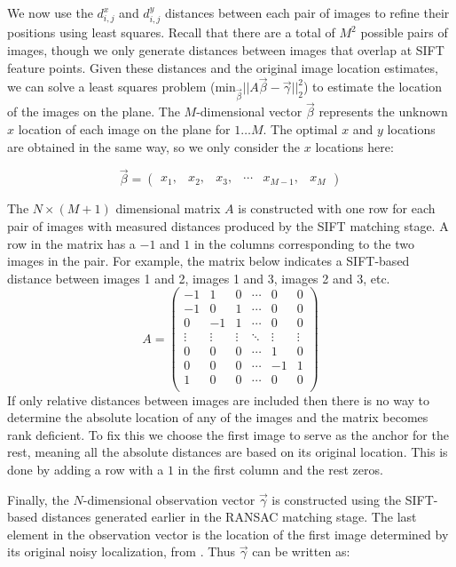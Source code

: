 \message{ !name(oldpaper.tex)}\documentclass[10pt,twocolumn,letterpaper]{article}
\begin{document}
We now use the $d^x_{i,j}$ and $d^y_{i,j}$ distances between each pair
of images to refine their positions using least squares. Recall that
there are a total of $M^{2}$ possible pairs of images, though we only
generate distances between images that overlap at SIFT feature
points. Given these distances and the original image location
estimates, we can solve a least squares problem
($\textrm{min}_{\vec{\beta}} ||A \vec{\beta} - \vec{\gamma}||_2^2 $)
to estimate the location of the images on the plane. The
$M$-dimensional vector $\vec{\beta}$ represents the unknown $x$
location of each image on the plane for $1 \dots M$. The optimal $x$
and $y$ locations are obtained in the same way, so we only consider
the $x$ locations here:

\[\vec{\beta} =
\begin{pmatrix}
  x_1, & x_2, & x_3, & \cdots & x_{M-1}, & x_M
\end{pmatrix}
\]

The $N \times (M+1)$ dimensional matrix $A$ is constructed with one
row for each pair of images with measured distances produced by the
SIFT matching stage. A row in the matrix has a $-1$ and $1$ in the
columns corresponding to the two images in the pair. For example, the
matrix below indicates a SIFT-based distance between images 1 and 2,
images 1 and 3, images 2 and 3, etc.
\[
A =
\begin{pmatrix}
  -1 & 1 & 0 & \cdots & 0 & 0\\
  -1 & 0 & 1 & \cdots & 0 & 0\\
  0 & -1 & 1 & \cdots & 0 & 0\\
  \vdots  & \vdots & \vdots & \ddots & \vdots  & \vdots\\
  0 & 0 & 0 & \cdots & 1 & 0 \\
  0 & 0 & 0 & \cdots & -1 & 1 \\
  1 & 0 & 0 & \cdots & 0 & 0 \\
\end{pmatrix}
\]
If only relative distances between images are included then there is
no way to determine the absolute location of any of the images and the
matrix becomes rank deficient. To fix this we choose the first image
to serve as the anchor for the rest, meaning all the absolute
distances are based on its original location. This is done by adding a
row with a $1$ in the first column and the rest zeros.

Finally, the $N$-dimensional observation vector $\vec{\gamma}$ is
constructed using the SIFT-based distances generated earlier in the
RANSAC matching stage. The last element in the observation vector is
the location of the first image determined by its original noisy
localization, from \cite{chen2010indoor, liu2010indoor}. Thus
$\vec{\gamma}$ can be written as:
\end{document}
